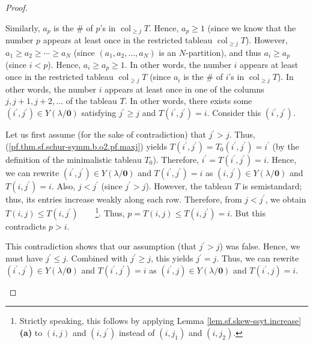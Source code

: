 \begin{proof}
\begin{fineprint}
Similarly, $a_{p}$ is the \# of $p$'s in $\operatorname{col}_{\geq j}T$.
Hence, $a_{p}\geq1$ (since we know that the number $p$ appears at least once
in the restricted tableau $\operatorname{col}_{\geq j}T$). However, $a_{1}\geq
a_{2}\geq\cdots\geq a_{N}$ (since $\left(  a_{1},a_{2},\ldots,a_{N}\right)  $
is an $N$-partition), and thus $a_{i}\geq a_{p}$ (since $i<p$). Hence,
$a_{i}\geq a_{p}\geq1$. In other words, the number $i$ appears at least once
in the restricted tableau $\operatorname{col}_{\geq j}T$ (since $a_{i}$ is the
\# of $i$'s in $\operatorname{col}_{\geq j}T$). In other words, the number $i$
appears at least once in one of the columns $j,j+1,j+2,\ldots$ of the tableau
$T$. In other words, there exists some $\left(  i^{\prime},j^{\prime}\right)
\in Y\left(  \lambda/\mathbf{0}\right)  $ satisfying $j^{\prime}\geq j$ and
$T\left(  i^{\prime},j^{\prime}\right)  =i$. Consider this $\left(  i^{\prime
},j^{\prime}\right)  $.

Let us first assume (for the sake of contradiction) that $j^{\prime}>j$. Thus,
(\ref{pf.thm.sf.schur-symm.b.o2.pf.maxj}) yields $T\left(  i^{\prime
},j^{\prime}\right)  =T_{0}\left(  i^{\prime},j^{\prime}\right)  =i^{\prime}$
(by the definition of the minimalistic tableau $T_{0}$). Therefore,
$i^{\prime}=T\left(  i^{\prime},j^{\prime}\right)  =i$. Hence, we can rewrite
$\left(  i^{\prime},j^{\prime}\right)  \in Y\left(  \lambda/\mathbf{0}\right)
$ and $T\left(  i^{\prime},j^{\prime}\right)  =i$ as $\left(  i,j^{\prime
}\right)  \in Y\left(  \lambda/\mathbf{0}\right)  $ and $T\left(  i,j^{\prime
}\right)  =i$. Also, $j<j^{\prime}$ (since $j^{\prime}>j$). However, the
tableau $T$ is semistandard; thus, its entries increase weakly along each row.
Therefore, from $j<j^{\prime}$, we obtain $T\left(  i,j\right)  \leq T\left(
i,j^{\prime}\right)  $\ \ \ \ \footnote{Strictly speaking, this follows by
applying Lemma \ref{lem.sf.skew-ssyt.increase} \textbf{(a)} to $\left(
i,j\right)  $ and $\left(  i,j^{\prime}\right)  $ instead of $\left(
i,j_{1}\right)  $ and $\left(  i,j_{2}\right)  $.}. Thus, $p=T\left(
i,j\right)  \leq T\left(  i,j^{\prime}\right)  =i$. But this contradicts $p>i$.

This contradiction shows that our assumption (that $j^{\prime}>j$) was false.
Hence, we must have $j^{\prime}\leq j$. Combined with $j^{\prime}\geq j$, this
yields $j^{\prime}=j$. Thus, we can rewrite $\left(  i^{\prime},j^{\prime
}\right)  \in Y\left(  \lambda/\mathbf{0}\right)  $ and $T\left(  i^{\prime
},j^{\prime}\right)  =i$ as $\left(  i^{\prime},j\right)  \in Y\left(
\lambda/\mathbf{0}\right)  $ and $T\left(  i^{\prime},j\right)  =i$.


\end{fineprint}
\end{proof}
